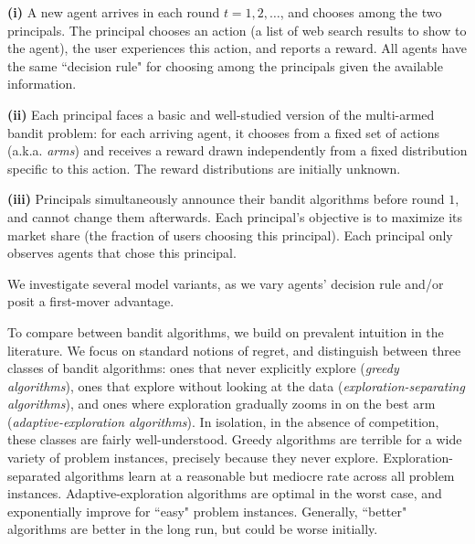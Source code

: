\documentclass[10pt]{article}
\begin{document}
\textbf{(i)}
A new agent arrives in each round $t=1,2, \ldots$, and chooses among the two principals. The principal chooses an action (\eg a list of web search results to show to the agent), the user experiences this action, and reports a reward. All agents have the same ``decision rule" for choosing among the principals given the available information.

\textbf{(ii)}
Each principal faces a basic and well-studied version of the multi-armed bandit problem: for each arriving agent, it chooses from a fixed set of actions  (a.k.a. \emph{arms}) and receives a reward drawn independently from a fixed distribution specific to this action. The reward distributions are initially unknown.

\textbf{(iii)}
Principals simultaneously announce their bandit algorithms before round $1$, and cannot change them afterwards.  Each principal's objective is to maximize its market share (the fraction of users choosing this principal). Each principal only observes agents that chose this principal.

We investigate several model variants, as we vary agents' decision rule and/or posit a first-mover advantage.



To compare between bandit algorithms, we build on prevalent intuition in the literature. We focus on standard notions of regret, and distinguish between three classes of bandit algorithms: ones that never explicitly explore (\emph{greedy algorithms}), ones that explore without looking at the data (\emph{exploration-separating algorithms}), and ones where exploration gradually zooms in on the best arm (\emph{adaptive-exploration algorithms}). In isolation, \ie in the absence of competition, these classes are fairly well-understood. Greedy algorithms are terrible for a wide variety of problem instances, precisely because they never explore. Exploration-separated algorithms learn at a reasonable but mediocre rate across all problem instances. Adaptive-exploration algorithms are optimal in the worst case, and exponentially improve for ``easy" problem instances. Generally,  ``better" algorithms are better in the long run, but could be worse initially.
\end{document}
